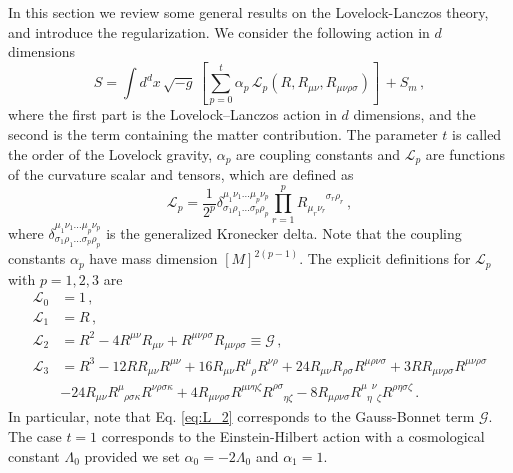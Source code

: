 \documentclass[aps,prd,preprint,nofootinbib]{revtex4-1}
\begin{document}
In this section we review some general results on the Lovelock-Lanczos theory, and introduce the regularization. We consider the following action in $d$ dimensions
\begin{equation}
    S = \int d^dx \,\sqrt{-g} \, \left[\sum_{p=0}^t \alpha_p \, \mathcal{L}_p\left(R,R_{\mu \nu},R_{\mu \nu \rho \sigma}\right)\right]\, + S_m\,,\label{eq:action_g}
\end{equation}
where the first part is the Lovelock--Lanczos action in $d$ dimensions, and the second is the term containing the matter contribution. The parameter $t$ is called the order of the Lovelock gravity, $\alpha_p$ are coupling constants and $\mathcal{L}_p$ are functions of the curvature scalar and tensors, which are defined as
\begin{equation}
\mathcal{L}_p = \frac{1}{2^p} \delta^{\mu_1 \nu_1 \dots \mu_p \nu_p}_{\sigma_1 \rho_1 \dots \sigma_p \rho_p} \prod  _{r=1}^p R^{\phantom{\mu_r \nu_r} \sigma_r \rho_r}_{\mu_r \nu_r}\,,
\end{equation}
where $\delta^{\mu_1 \nu_1 \dots \mu_p \nu_p}_{\sigma_1 \rho_1 \dots \sigma_p \rho_p}$ is the generalized Kronecker delta. Note that the coupling constants $\alpha_p$ have mass dimension $[M]^{2(p-1)}$.
The explicit definitions for $\mathcal{L}_p$ with $p=1,2,3$  are
\begin{align}
\mathcal{L}_0 &= 1 \,,\label{eq:L_0}\\
\mathcal{L}_1 &= R \,,\label{eq:L_1}\\
\mathcal{L}_2 &= R^2 - 4 R^{\mu \nu} R_{\mu \nu} + R^{\mu \nu \rho \sigma} R_{\mu \nu \rho \sigma} \equiv \mathcal{G}\,, \label{eq:L_2}\\
\mathcal{L}_3 &= R^3   -12RR_{\mu \nu } R^{\mu \nu } + 16R_{\mu \nu }R^{\mu }_{\phantom{\mu } \rho }R^{\nu \rho }+ 24 R_{\mu \nu }R_{\rho \sigma }R^{\mu \rho \nu \sigma }+ 3RR_{\mu \nu \rho \sigma } R^{\mu \nu \rho \sigma } \nonumber \\
&-24R_{\mu \nu }R^\mu _{\phantom{\mu } \rho \sigma \kappa } R^{\nu \rho \sigma \kappa  }+ 4 R_{\mu \nu \rho \sigma }R^{\mu \nu \eta \zeta } R^{\rho \sigma }_{\phantom{\rho \sigma } \eta \zeta }-8R_{\mu \rho \nu \sigma } R^{\mu  \phantom{\eta } \nu }_{\phantom{\mu } \eta 
\phantom{\nu } \zeta } R^{\rho  \eta  \sigma  \zeta }\,. \label{eq:L_3}
\end{align}
In particular, note that Eq. \eqref{eq:L_2} corresponds to the Gauss-Bonnet term $\mathcal{G}$. The case $t=1$ corresponds to the Einstein-Hilbert action with a cosmological constant $\Lambda_0$ provided we set $\alpha_0=-2\Lambda_0$ and $\alpha_1 = 1$. 
\end{document}
